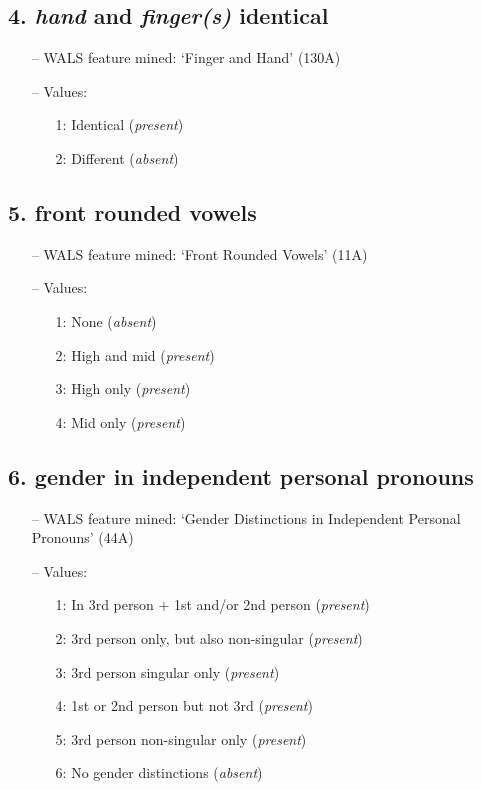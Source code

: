 \subsection*{4. \emph{hand} and \emph{finger(s)} identical}

\begin{itemize}
\item[--] WALS feature mined: `Finger and Hand' (130A)
\item[--] Values:

\begin{enumerate}
\item[1:] Identical (\emph{present})
\item[2:] Different (\emph{absent})
\end{enumerate}
\end{itemize}

\subsection*{5. front rounded vowels}

\begin{itemize}
\item[--] WALS feature mined: `Front Rounded Vowels' (11A)
\item[--] Values:

\begin{enumerate}
\item[1:] None (\emph{absent})
\item[2:] High and mid (\emph{present})
\item[3:] High only (\emph{present})
\item[4:] Mid only (\emph{present})
\end{enumerate}
\end{itemize}

\subsection*{6. gender in independent personal pronouns}

\begin{itemize}
\item[--] WALS feature mined: `Gender Distinctions in Independent Personal Pronouns' (44A)
\item[--] Values:

\begin{enumerate}
\item[1:] In 3rd person + 1st and/or 2nd person (\emph{present})
\item[2:] 3rd person only, but also non-singular (\emph{present})
\item[3:] 3rd person singular only (\emph{present})
\item[4:] 1st or 2nd person but not 3rd (\emph{present})
\item[5:] 3rd person non-singular only (\emph{present})
\item[6:] No gender distinctions (\emph{absent})
\end{enumerate}
\end{itemize}

